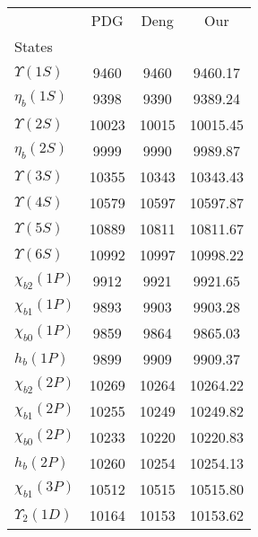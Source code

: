 \begin{tabular}{lccc}
\toprule
{} &    PDG &   Deng &       Our \\
States             &        &        &           \\
\midrule
$\Upsilon(1S)$     &   9460 &   9460 &   9460.17 \\
$\eta_{b}(1S)$     &   9398 &   9390 &   9389.24 \\
$\Upsilon(2S)$     &  10023 &  10015 &  10015.45 \\
$\eta_{b}(2S)$     &   9999 &   9990 &   9989.87 \\
$\Upsilon(3S)$     &  10355 &  10343 &  10343.43 \\
$\Upsilon(4S)$     &  10579 &  10597 &  10597.87 \\
$\Upsilon(5S)$     &  10889 &  10811 &  10811.67 \\
$\Upsilon(6S)$     &  10992 &  10997 &  10998.22 \\
$\chi_{b2}(1P)$    &   9912 &   9921 &   9921.65 \\
$\chi_{b1}(1P)$    &   9893 &   9903 &   9903.28 \\
$\chi_{b0}(1P)$    &   9859 &   9864 &   9865.03 \\
$h_{b}(1P)$        &   9899 &   9909 &   9909.37 \\
$\chi_{b2}(2P)$    &  10269 &  10264 &  10264.22 \\
$\chi_{b1}(2P)$    &  10255 &  10249 &  10249.82 \\
$\chi_{b0}(2P)$    &  10233 &  10220 &  10220.83 \\
$h_{b}(2P)$        &  10260 &  10254 &  10254.13 \\
$\chi_{b1}(3P)$    &  10512 &  10515 &  10515.80 \\
$\Upsilon_{2}(1D)$ &  10164 &  10153 &  10153.62 \\

\end{tabular}
